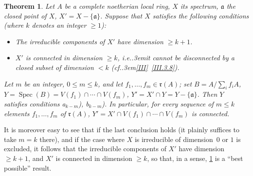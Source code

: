 \documentclass[11pt,a4paper,oneside]{book}
\providecommand{\og}{``}
\providecommand{\fg}{''\xspace}
\providecommand{\cf}{cf.\kern.3em}
\providecommand{\ie}{i.e.\kern.3em}
\providecommand{\ideal}[1]{\mathfrak{#1}}
\providecommand{\aaa}{\ideal a}
\providecommand{\rr}{\ideal r}
\providecommand{\Spec}{\operatorname{Spec}}
\theoremstyle{plain}
\newtheorem{theoreme}[subsection]{Theorem}
\theoremstyle{definition}
\theoremstyle{remark}
\renewcommand{\Ref}[1]{\textup{\ref{#1}}}
\begin{document}
\begin{theoreme} \label{XIII.2.1}
Let $A$ be a complete noetherian local ring, $X$ its spectrum, $\aaa$ the closed point of $X$, $X'=X-\{ \aaa\}$. Suppose that $X$ satisfies the following conditions (where $k$ denotes an integer $\ge 1$):
\begin{itemize}
\item[a$_k$)] The irreducible components of $X'$ have dimension $\ge k+1$.

\item[b$_k$)] $X'$ is connected in dimension $\ge k$, \ie it cannot be disconnected by a closed subset of dimension $<k$ (\cf \Ref{III}~\Ref{III.3.8}).
\end{itemize}

Let $m$ be an integer, $0\le m\le k$, and let $f_1, \dotsc, f_m\in \rr(A)$; set $B=A/\sum_i f_iA$, $Y=\Spec(B)=V(f_1)\cap\dotsb\cap V(f_m)$, $Y'=X'\cap Y=Y-\{\aaa\}$. Then $Y$ satisfies conditions a$_{k-m}$), b$_{k-m}$). In particular, for every sequence of $m\le k$ elements $f_1, \dotsc, f_m$ of $\rr(A)$, $Y'=X'\cap V(f_1)\cap\dotsb\cap V(f_m)$ is connected.
\end{theoreme}

It is moreover easy to see that if the last conclusion holds (it plainly suffices to take $m=k$ there), and if the case where $X$ is irreducible of dimension~$0$ or $1$ is excluded, it follows that the irreducible components of $X'$ have dimension $\ge k+1$, and $X'$ is connected in dimension $\geq k$, so that, in a sense, \Ref{XIII.2.1} is a \og best possible\fg result.

\bigskip
\end{document}

